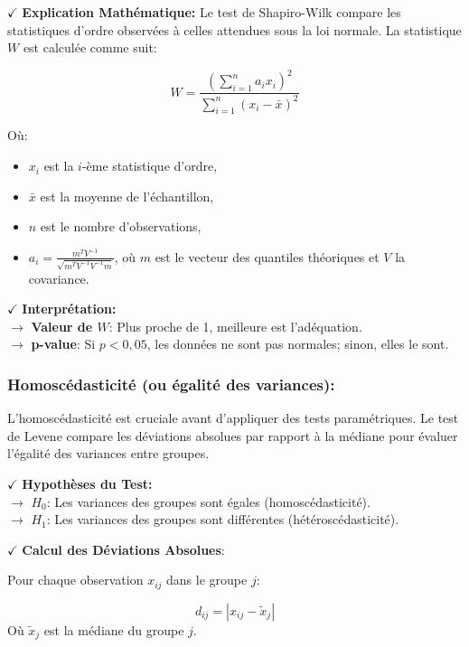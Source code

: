 \textbf{\(\checkmark\)} \textbf{Explication Mathématique:}
Le test de Shapiro-Wilk compare les statistiques d'ordre observées à celles attendues sous la loi normale. La statistique \( W \) est calculée comme suit:

\[
W = \frac{\left( \sum_{i=1}^{n} a_i x_i \right)^2}{\sum_{i=1}^{n} (x_i - \bar{x})^2}
\]

Où:
\begin{itemize}
    \item \( x_i \) est la \( i \)-ème statistique d'ordre,
    \item \( \bar{x} \) est la moyenne de l'échantillon,
    \item \( n \) est le nombre d'observations,
    \item \( a_i = \frac{m^T V^{-1}}{\sqrt{m^T V^{-1} V^{-1} m}} \), où \( m \) est le vecteur des quantiles théoriques et \( V \) la covariance.
\end{itemize}

\textbf{\(\checkmark\)} \textbf{Interprétation:}\\
\noindent \textbf{\(\rightarrow\)} \textbf{Valeur de \( W \)}: Plus proche de 1, meilleure est l'adéquation.\\
\textbf{\(\rightarrow\)} \textbf{p-value}: Si \( p < 0,05 \), les données ne sont pas normales; sinon, elles le sont.

\subsubsection*{Homoscédasticité (ou égalité des variances):}

L'homoscédasticité est cruciale avant d'appliquer des tests paramétriques. Le test de Levene \cite{Levene} compare les déviations absolues par rapport à la médiane pour évaluer l'égalité des variances entre groupes.

\textbf{\(\checkmark\)} \textbf{Hypothèses du Test:}\\
\noindent \textbf{\(\rightarrow\)} \( H_0 \): Les variances des groupes sont égales (homoscédasticité).\\
\textbf{\(\rightarrow\)} \( H_1 \): Les variances des groupes sont différentes (hétéroscédasticité).

\textbf{\(\checkmark\)} \textbf{Calcul des Déviations Absolues}:

Pour chaque observation \( x_{ij} \) dans le groupe \( j \):

\[
d_{ij} = \left| x_{ij} - \tilde{x}_j \right|
\]
Où \( \tilde{x}_j \) est la médiane du groupe \( j \).


